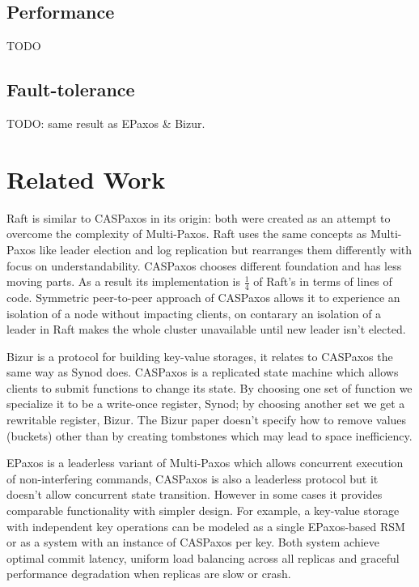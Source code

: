\documentclass[12pt]{article}
\theoremstyle{definition}
\begin{document}
\subsection{Performance}

TODO

\subsection{Fault-tolerance}

TODO: same result as EPaxos \& Bizur.

\section{Related Work}

Raft is similar to CASPaxos in its origin: both were created as an attempt to overcome the complexity of Multi-Paxos. Raft uses the same concepts as Multi-Paxos like leader election and log replication but rearranges them differently with focus on understandability. CASPaxos chooses different foundation and has less moving parts. As a result its implementation is $\frac{1}{4}$ of Raft's in terms of lines of code. Symmetric peer-to-peer approach of CASPaxos allows it to experience an isolation of a node without impacting clients, on contarary an isolation of a leader in Raft makes the whole cluster unavailable until new leader isn't elected.

Bizur is a protocol for building key-value storages, it relates to CASPaxos the same way as Synod does. CASPaxos is a replicated state machine which allows clients to submit functions to change its state. By choosing one set of function we specialize it to be a write-once register, Synod; by choosing another set we get a rewritable register, Bizur. The Bizur paper doesn't specify how to remove values (buckets) other than by creating tombstones which may lead to space inefficiency.

EPaxos is a leaderless variant of Multi-Paxos which allows concurrent execution of non-interfering commands, CASPaxos is also a leaderless protocol but it doesn't allow concurrent state transition. However in some cases it provides comparable functionality with simpler design. For example, a key-value storage with independent key operations can be modeled as a single EPaxos-based RSM or as a system with an instance of CASPaxos per key. Both system achieve optimal commit latency, uniform load balancing across all replicas and graceful performance degradation when replicas are slow or crash.
\end{document}
